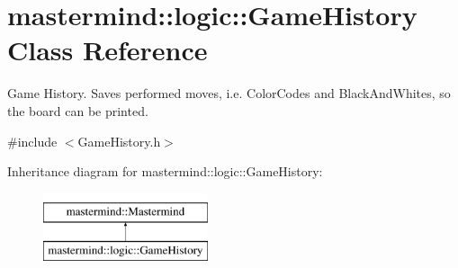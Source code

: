 \hypertarget{classmastermind_1_1logic_1_1_game_history}{}\section{mastermind\+:\+:logic\+:\+:Game\+History Class Reference}
\label{classmastermind_1_1logic_1_1_game_history}


Game History. Saves performed moves, i.\+e. Color\+Codes and Black\+And\+Whites, so the board can be printed.  




{\ttfamily \#include $<$Game\+History.\+h$>$}

Inheritance diagram for mastermind\+:\+:logic\+:\+:Game\+History\+:\begin{figure}[H]
\begin{center}
\leavevmode
\includegraphics[height=2.000000cm]{classmastermind_1_1logic_1_1_game_history}
\end{center}
\end{figure}
